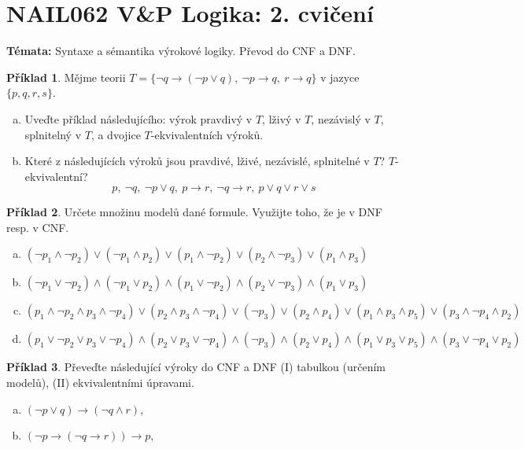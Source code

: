 \documentclass[a4paper]{article}
\theoremstyle{definition}
\newtheorem{problem}{Příklad}
\begin{document}
\section*{NAIL062 V\&P Logika: 2. cvičení}


\textbf{Témata:} 
Syntaxe a sémantika výrokové logiky. Převod do CNF a DNF.

\medskip\begin{problem}
    Mějme teorii $T=\{\neg q \to (\neg p \vee q),\ \neg p \to q,\ r \to q\}$ v jazyce $\{p, q, r, s\}$.
    \begin{enumerate}[(a)]
        \item Uveďte příklad následujícího: výrok pravdivý v $T$, lživý v $T$, nezávislý v $T$, splnitelný v $T$, a dvojice $T$-ekvivalentních výroků.
        \item Které z následujících výroků jsou pravdivé, lživé, nezávislé, splnitelné v $T$? $T$-ekvivalentní? 
        $$
        p, \ \neg q, \ \neg p\vee q, \ p\to r,\ \neg q\to r, \ p\vee q\vee r\vee s
        $$
    \end{enumerate}
\end{problem}
    
    
\medskip\begin{problem} Určete množinu modelů dané formule. Využijte toho, že je v DNF resp. v CNF.
\begin{enumerate}[(a)]
    \item $(\neg p_1 \wedge \neg p_2)\vee( \neg p_1 \wedge p_2)\vee( p_1 \wedge \neg p_2)\vee( p_2 \wedge \neg p_3)\vee( p_1 \wedge p_3)$
    \item $(\neg p_1 \vee \neg p_2)\wedge( \neg p_1 \vee p_2)\wedge( p_1 \vee \neg p_2)\wedge( p_2 \vee \neg p_3)\wedge( p_1 \vee p_3)$
    \item $(p_1 \wedge  \neg p_2 \wedge  p_3 \wedge  \neg p_4 )\vee(p_2 \wedge  p_3 \wedge  \neg p_4 )\vee(\neg p_3)\vee(p_2 \wedge  p_4)\vee(p_1 \wedge  p_3 \wedge  p_5 )\vee(p_3 \wedge  \neg p_4 \wedge  p_2 )$
    \item $(p_1 \vee \neg p_2 \vee p_3 \vee \neg p_4 )\wedge(p_2 \vee p_3 \vee \neg p_4 )\wedge(\neg p_3)\wedge(p_2 \vee p_4)\wedge(p_1 \vee p_3 \vee p_5 )\wedge(p_3 \vee \neg p_4 \vee p_2 )$
\end{enumerate}
\end{problem}
    
    
\medskip\begin{problem} Převeďte následující výroky do CNF a DNF (I) tabulkou (určením modelů), (II) ekvivalentními úpravami.
\begin{enumerate}[(a)]
    \item $(\neg p \vee q)\to (\neg q \wedge r)$,
    \item $(\neg p \to (\neg q \to r))\to p$,
\end{enumerate}
\end{problem}
    
\end{document}
